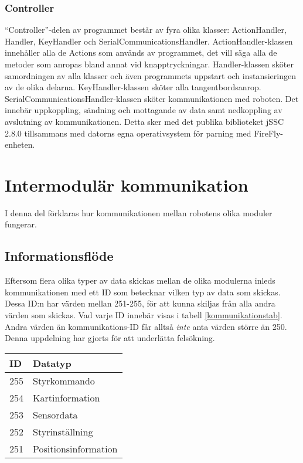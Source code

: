 \documentclass[11pt]{article}
\begin{document}
\begin{flushleft}
\subsubsection{Controller}
``Controller''-delen av programmet består av fyra olika klasser: ActionHandler, Handler, KeyHandler och SerialCommunicationsHandler. 
ActionHandler-klassen innehåller alla de Actions som används av programmet, det vill säga alla de metoder som anropas bland annat vid knapptryckningar.
Handler-klassen sköter samordningen av alla klasser och även programmets uppstart och instansieringen av de olika delarna.
KeyHandler-klassen sköter alla tangentbordsanrop.
SerialCommunicationsHandler-klassen sköter kommunikationen med roboten. Det innebär uppkoppling, sändning och mottagande av data samt nedkoppling av avslutning av kommunikationen. Detta sker med det publika biblioteket jSSC 2.8.0 tillsammans med datorns egna operativsystem för parning med FireFly-enheten.

\pagebreak

\section{Intermodulär kommunikation}
I denna del förklaras hur kommunikationen mellan robotens olika moduler fungerar.

\subsection{Informationsflöde}
Eftersom flera olika typer av data skickas mellan de olika modulerna inleds kommunikationen med ett ID som betecknar vilken typ av data som skickas. Dessa ID:n har värden mellan 251-255, för att kunna skiljas från alla andra värden som skickas. Vad varje ID innebär visas i tabell \ref{kommunikationstab}. Andra värden än kommunikations-ID får alltså \emph{inte} anta värden större än 250. Denna uppdelning har gjorts för att underlätta felsökning.

\begin{longtable}[c]{| l | l |} \hline
  \centering
\textbf{ID} & \textbf{Datatyp} \\ \hline 
255 & Styrkommando \\ \hline
254 & Kartinformation \\ \hline
253 & Sensordata \\ \hline
252 & Styrinställning \\ \hline
251 & Positionsinformation \\ \hline


\end{longtable}
\end{flushleft}
\end{document}
